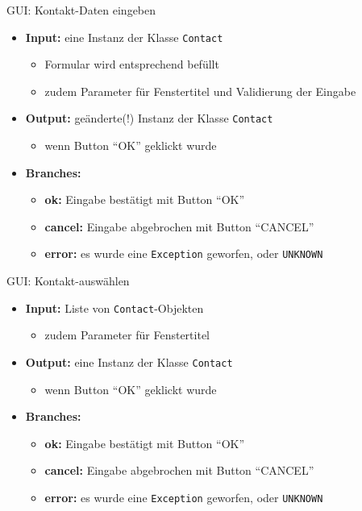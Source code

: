 \begin{frame}{GUI: Kontakt-Daten eingeben}
\begin{itemize}
	\item \textbf{Input:} eine Instanz der Klasse \texttt{Contact}
		\begin{itemize}
			\item Formular wird entsprechend befüllt
			\item zudem Parameter für Fenstertitel und Validierung der Eingabe
		\end{itemize}
	\pause
	\item \textbf{Output:} geänderte(!) Instanz der Klasse \texttt{Contact}
		\begin{itemize}
			\item wenn Button "`OK"' geklickt wurde
		\end{itemize}
	\pause
	\item \textbf{Branches:}
		\begin{itemize}
			\item \textbf{ok:} Eingabe bestätigt mit Button "`OK"'
			\item \textbf{cancel:} Eingabe abgebrochen mit Button "`CANCEL"'
			\item \textbf{error:} es wurde eine \texttt{Exception} geworfen, oder \texttt{UNKNOWN}
		\end{itemize}

\end{itemize}
\end{frame}


\begin{frame}{GUI: Kontakt-auswählen}
\begin{itemize}
	\item \textbf{Input:} Liste von \texttt{Contact}-Objekten
		\begin{itemize}
			\item zudem Parameter für Fenstertitel
		\end{itemize}
	\item \textbf{Output:} eine Instanz der Klasse \texttt{Contact}
		\begin{itemize}
			\item wenn Button "`OK"' geklickt wurde
		\end{itemize}

	\item \textbf{Branches:}
		\begin{itemize}
			\item \textbf{ok:} Eingabe bestätigt mit Button "`OK"'
			\item \textbf{cancel:} Eingabe abgebrochen mit Button "`CANCEL"'
			\item \textbf{error:} es wurde eine \texttt{Exception} geworfen, oder \texttt{UNKNOWN}
		\end{itemize}

\end{itemize}
\end{frame}


